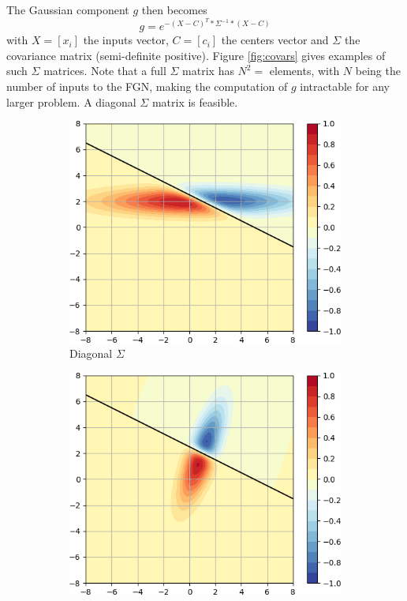 \documentclass[12pt,oneside]{CUNY_PhD}
\begin{document}
The Gaussian component $g$ then becomes
\[g = e^{-(X-C)^T * \Sigma^{-1} * (X-C)}\]
with $X=[x_i]$ the inputs vector, $C=[c_i]$ the centers vector and $\Sigma$ the covariance matrix (semi-definite positive). Figure \ref{fig:covars} gives examples of such $\Sigma$ matrices. Note that a full $\Sigma$ matrix has $N^2=$ elements, with $N$ being the number of inputs to the FGN, making the computation of $g$ intractable for any larger problem. A diagonal $\Sigma$ matrix is feasible.
\begin{figure}[!t]
    \centering
    \begin{subfigure}[t]{0.49\textwidth}
        \includegraphics[width=\textwidth]{images/Variants-Diag-Full-Cov/diag_full_activity_cropped.png}
        \caption*{Diagonal $\Sigma$}
    \end{subfigure}
    \begin{subfigure}[t]{0.49\textwidth}
        \includegraphics[width=\textwidth]{images/Variants-Diag-Full-Cov/full_full_activity_cropped.png}

\end{subfigure}
\end{figure}
\end{document}
